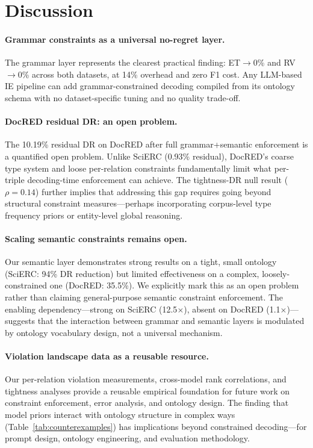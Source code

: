 \documentclass[11pt,a4paper]{article}
\begin{document}
\section{Discussion}
\label{sec:discussion}

\paragraph{Grammar constraints as a universal no-regret layer.}
The grammar layer represents the clearest practical finding: ET${\to}$0\% and RV${\to}$0\% across both datasets, at 14\% overhead and zero F1 cost.
Any LLM-based IE pipeline can add grammar-constrained decoding compiled from its ontology schema with no dataset-specific tuning and no quality trade-off.

\paragraph{DocRED residual DR: an open problem.}
The 10.19\% residual DR on DocRED after full grammar+semantic enforcement is a quantified open problem.
Unlike SciERC (0.93\% residual), DocRED's coarse type system and loose per-relation constraints fundamentally limit what per-triple decoding-time enforcement can achieve.
The tightness-DR null result ($\rho{=}0.14$) further implies that addressing this gap requires going beyond structural constraint measures---perhaps incorporating corpus-level type frequency priors or entity-level global reasoning.

\paragraph{Scaling semantic constraints remains open.}
Our semantic layer demonstrates strong results on a tight, small ontology (SciERC: 94\% DR reduction) but limited effectiveness on a complex, loosely-constrained one (DocRED: 35.5\%).
We explicitly mark this as an open problem rather than claiming general-purpose semantic constraint enforcement.
The enabling dependency---strong on SciERC (12.5$\times$), absent on DocRED (1.1$\times$)---suggests that the interaction between grammar and semantic layers is modulated by ontology vocabulary design, not a universal mechanism.

\paragraph{Violation landscape data as a reusable resource.}
Our per-relation violation measurements, cross-model rank correlations, and tightness analyses provide a reusable empirical foundation for future work on constraint enforcement, error analysis, and ontology design.
The finding that model priors interact with ontology structure in complex ways (Table~\ref{tab:counterexamples}) has implications beyond constrained decoding---for prompt design, ontology engineering, and evaluation methodology.
\end{document}
